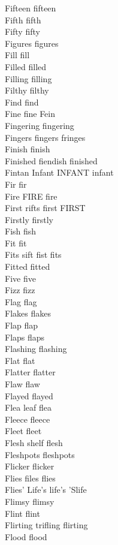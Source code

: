 Fifteen fifteen\\
Fifth fifth\\
Fifty fifty\\
Figures figures\\
Fill fill\\
Filled filled\\
Filling filling\\
Filthy filthy\\
Find find\\
Fine fine Fein\\
Fingering fingering\\
Fingers fingers fringes\\
Finish finish\\
Finished fiendish finished\\
Fintan Infant INFANT infant\\
Fir fir\\
Fire FIRE fire\\
First rifts first FIRST\\
Firstly firstly\\
Fish fish\\
Fit fit\\
Fits sift fist fits\\
Fitted fitted\\
Five five\\
Fizz fizz\\
Flag flag\\
Flakes flakes\\
Flap flap\\
Flaps flaps\\
Flashing flashing\\
Flat flat\\
Flatter flatter\\
Flaw flaw\\
Flayed flayed\\
Flea leaf flea\\
Fleece fleece\\
Fleet fleet\\
Flesh shelf flesh\\
Fleshpots fleshpots\\
Flicker flicker\\
Flies files flies\\
Flies' Life's life's 'Slife\\
Flimsy flimsy\\
Flint flint\\
Flirting trifling flirting\\
Flood flood\\
